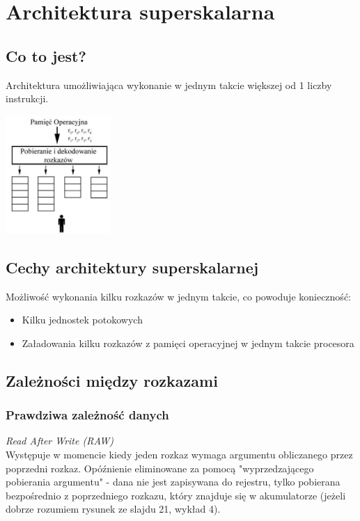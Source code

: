 \section{Architektura superskalarna}
	\subsection{Co to jest?}
		Architektura umożliwiająca wykonanie w jednym takcie większej od 1 liczby instrukcji.
		\begin{center}
			\includegraphics[width=0.3\textwidth]{./images/superskalarna01}
		\end{center}
   	\subsection{Cechy architektury superskalarnej}
        Możliwość wykonania kilku rozkazów w jednym takcie, co powoduje konieczność:
		\begin{itemize}
          	\item Kilku jednostek potokowych
         	\item Załadowania kilku rozkazów z pamięci operacyjnej w jednym takcie procesora
		\end{itemize}
	\newpage
    \subsection{Zależności między rozkazami}
    	\subsubsection{Prawdziwa zależność danych}
    		\emph{Read After Write (RAW)}\\
    		Występuje w momencie kiedy jeden rozkaz wymaga argumentu obliczanego przez poprzedni rozkaz. Opóźnienie eliminowane za pomocą "wyprzedzającego pobierania argumentu" - dana nie jest zapisywana do rejestru, tylko pobierana bezpośrednio z poprzedniego rozkazu, który znajduje się w akumulatorze (jeżeli dobrze rozumiem rysunek ze slajdu 21, wykład 4).
